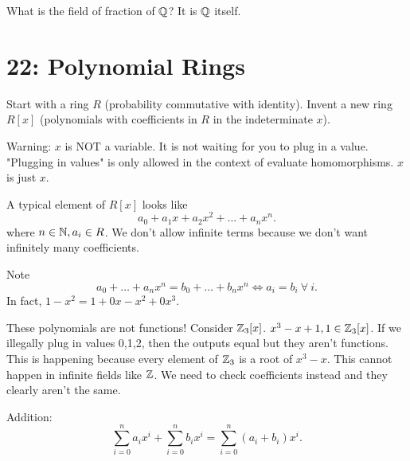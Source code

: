 \documentclass[class=article,crop=false]{standalone}
\begin{document}
\begin{eg}[]
What is the field of fraction of $ \mathbb{Q}$? It is $ \mathbb{Q}$ itself.
\end{eg}

\section*{22: Polynomial Rings}

Start with a ring $ R$ (probability commutative with identity). Invent a new ring  $ R[x]$ (polynomials with coefficients in  $ R$ in the indeterminate $ x$).  

Warning: $ x$ is NOT a variable. It is not waiting for you to plug in a value. "Plugging in values" is only allowed in the context of evaluate homomorphisms.  $ x$ is just  $ x$.

A typical element of  $ R[x]$ looks like
 \[
a_0+a_1x+a_2 x^2 + \ldots + a_n x^{n}
.\]
where $ n \in \mathbb{N}, a_i \in R$. We don't allow infinite terms because we don't want infinitely many coefficients. 

Note
\[
a_0+\ldots +a_n x^{n} = b_0 + \ldots + b_n x^{n} \iff a_i=b_i \ \forall \ i
.\]
In fact, $ 1-x^2 = 1+0x-x^2+0x^3$. 

These polynomials are not functions! Consider $ \mathbb{Z}_3[x]$. $x^3-x+1, 1 \in \mathbb{Z}_3[x]$. If we illegally plug in values 0,1,2, then the outputs equal but they aren't functions. This is happening because every element of $ \mathbb{Z}_3$ is a root of $ x^3 -x$. This cannot happen in infinite fields like $ \mathbb{Z}$. We need to check coefficients instead and they clearly aren't the same.

Addition:
\[
	\sum_{ i= 0}^{ n} a_i x^{i} + \sum_{ i= 0}^{ n} b_i x^{i} = \sum_{ i= 0}^{ n} (a_i + b_i) x^{i} 
.\] 
\end{document}

